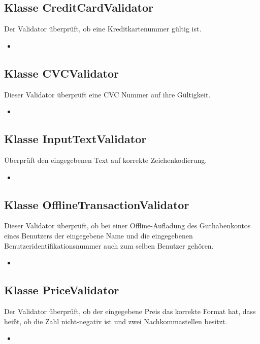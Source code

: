 \documentclass[a4paper]{scrreprt}
\begin{document}
	\subsection{Klasse CreditCardValidator}
	Der Validator überprüft, ob eine Kreditkartenummer gültig ist.
	\begin{itemize}
		\item \override
	\end{itemize}
	
	\subsection{Klasse CVCValidator}
	Dieser Validator überprüft eine CVC Nummer auf ihre Gültigkeit.
	\begin{itemize}
		\item \override
	\end{itemize}
	
	\subsection{Klasse InputTextValidator}
	Überprüft den eingegebenen Text auf korrekte Zeichenkodierung.
	\begin{itemize}
		\item \override
	\end{itemize}
	
	\subsection{Klasse OfflineTransactionValidator}
	Dieser Validator überprüft, ob bei einer Offline-Aufladung des Guthabenkontos eines Benutzers der eingegebene Name und die eingegebenen Benutzeridentifikationsnummer auch zum selben Benutzer gehören.
	\begin{itemize}
		\item \override
	\end{itemize}
	
	\subsection{Klasse PriceValidator}
	Der Validator überprüft, ob der eingegebene Preis das korrekte Format hat, dass heißt, ob die Zahl nicht-negativ ist und zwei Nachkommastellen besitzt.
	\begin{itemize}
		\item \override
	\end{itemize}
	
\end{document}
